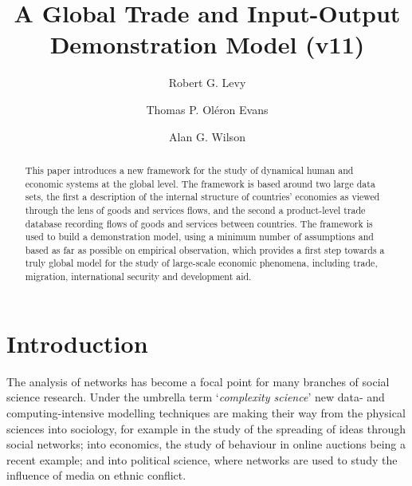 \documentclass[preprint,authoryear,3p]{elsarticle}
\begin{document}
\begin{frontmatter}
\title{A Global Trade and Input-Output Demonstration Model (v11)}
\author[casa]{Robert G. Levy }
\author[casa,uclmat]{Thomas P. Ol\'{e}ron Evans}
\author[casa]{Alan G. Wilson}
\address[casa]{Centre for Advanced Spatial Analysis, UCL Bartlett Faculty of the Built Environment,
90 Tottenham Court Road, London W1T 4TJ, UK}
\address[uclmat]{Department of Mathematics, University College London, Gower Street, London WC1E 6BT, UK}

\begin{abstract}
This paper introduces a new framework for the study of dynamical human and economic systems at the global level. The framework is based around two large data sets, the first a description of the internal structure of countries' economies as viewed through the lens of goods and services flows, and the second a product-level trade database recording flows of goods and services between countries. The framework is used to build a demonstration model, using a minimum number of assumptions and based as far as possible on empirical observation, which provides a first step towards a truly global model for the study of large-scale economic phenomena, including trade, migration, international security and development aid.
\end{abstract}

\begin{keyword}

\end{keyword}

\end{frontmatter}

\section{Introduction}
The analysis of networks has become a focal point for many branches of social science research. Under the umbrella term `\textit{complexity science}' new data- and computing-intensive modelling techniques are making their way from the physical sciences into sociology, for example in the study of the spreading of ideas through social networks; into economics, the study of behaviour in online auctions being a recent example; and into political science, where networks are used to study the influence of media on ethnic conflict.
\end{document}
